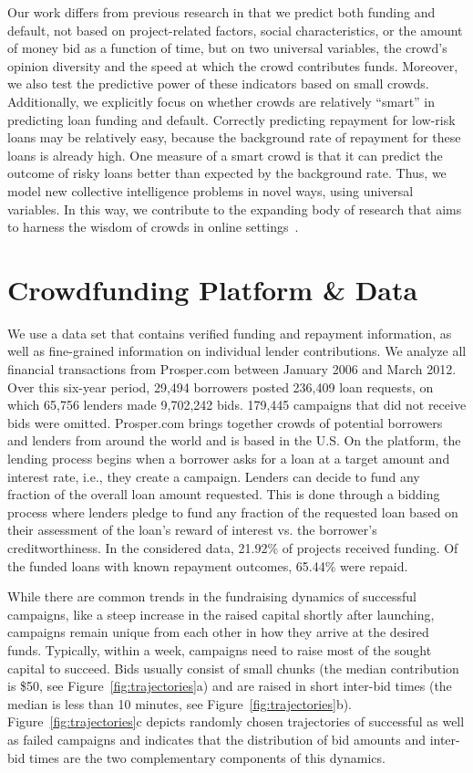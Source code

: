 \documentclass[sigconf]{acmart}
\begin{document}
Our work differs from previous research in that we predict both funding and default, not based on project-related factors, social characteristics, or the amount of money bid as a function of time, but on two universal variables, the crowd’s opinion diversity and the speed at which the crowd contributes funds. Moreover, we also test the predictive power of these indicators based on small crowds. Additionally, we explicitly focus on whether crowds are relatively ``smart'' in predicting loan funding and default. Correctly predicting repayment for low-risk loans may be relatively easy, because the background rate of repayment for these loans is already high. One measure of a smart crowd is that it can predict the outcome of risky loans better than expected by the background rate. Thus, we model new collective intelligence problems in novel ways, using universal variables. In this way, we contribute to the expanding body of research that aims to harness the wisdom of crowds in online settings~\cite{dambanemuya2019harnessing,simoiu2019studying,da2020harnessing}.

\section{Crowdfunding Platform \& Data}
We use a data set that contains verified funding and repayment information, as well as fine-grained information on individual lender contributions. We analyze all financial transactions from Prosper.com between January 2006 and March 2012. Over this six-year period, 29,494 borrowers posted 236,409 loan requests, on which 65,756 lenders made 9,702,242 bids. 179,445 campaigns that did not receive bids were omitted. Prosper.com brings together crowds of potential borrowers and lenders from around the world and is based in the U.S. On the platform, the lending process begins when a borrower asks for a loan at a target amount and interest rate, i.e., they create a campaign. Lenders can decide to fund any fraction of the overall loan amount requested. This is done through a bidding process where lenders pledge to fund any fraction of the requested loan based on their assessment of the loan’s reward of interest vs. the borrower's creditworthiness. In the considered data, 21.92\% of projects received funding. Of the funded loans with known repayment outcomes, 65.44\% were repaid.

While there are common trends in the fundraising dynamics of successful campaigns, like a steep increase in the raised capital shortly after launching, campaigns remain unique from each other in how they arrive at the desired funds. Typically, within a week, campaigns need to raise most of the sought capital to succeed. Bids usually consist of small chunks (the median contribution is \$50, see Figure~\ref{fig:trajectories}a) and are raised in short inter-bid times (the median is less than 10 minutes, see Figure~\ref{fig:trajectories}b). Figure~\ref{fig:trajectories}c depicts randomly chosen trajectories of successful as well as failed campaigns and indicates that the distribution of bid amounts and inter-bid times are the two complementary components of this dynamics.
\end{document}
